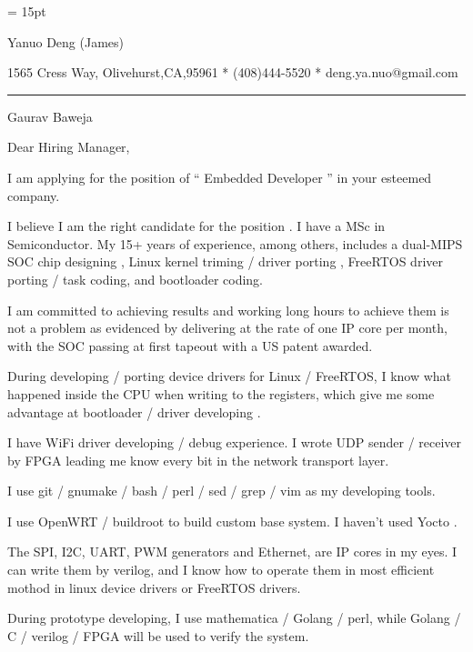 

  \FFrg \baselineskip = 15pt

{
Yanuo Deng (James)
}

{ 
1565 Cress Way, Olivehurst,CA,95961
*
(408)444-5520
*
deng.ya.nuo@gmail.com
}

{ \smallbreak } 

{\par\noindent\hrule} 

{ \bigbreak } 



Gaurav Baweja

{ 
Dear Hiring Manager,
}

{ \bigbreak } 
I am applying for the position of `` Embedded Developer '' in your esteemed company.

{ \bigbreak } 
I believe I am the right candidate for the position .
I have a MSc in Semiconductor.
My 15+ years of experience, among others, 
includes a dual-MIPS SOC chip designing ,
Linux kernel triming  /  driver porting , 
FreeRTOS driver porting  /  task coding,
and bootloader coding.

{ \bigbreak } 
I am committed to achieving results and working long hours 
to achieve them is not a problem as evidenced by 
delivering at the rate of one IP core per month,
with the SOC passing at first tapeout
with a US patent awarded.

{ \bigbreak } 
During developing  /  porting device drivers for Linux / FreeRTOS,
I know what happened inside the CPU when writing to the registers,
which give me some advantage at bootloader  /  driver developing .

{ \bigbreak } 
I have WiFi driver developing / debug experience. 
I wrote UDP sender / receiver by FPGA leading me know every bit in the network transport layer.

{ \bigbreak } 
I use git  /  gnumake  /  bash  /  perl  /  sed  /  grep  /  vim as my developing tools.

{ \bigbreak } 
I use OpenWRT / buildroot to build custom base system. I haven't used Yocto .

{ \bigbreak } 
The SPI, I2C, UART, PWM generators and Ethernet, are IP cores in my eyes.
I can write them by verilog, 
and I know how to operate them in most efficient mothod
in linux device drivers or FreeRTOS drivers.

{ \bigbreak } 
During prototype developing, I use mathematica / Golang / perl, 
while Golang / C / verilog / FPGA will be used to verify the system.


